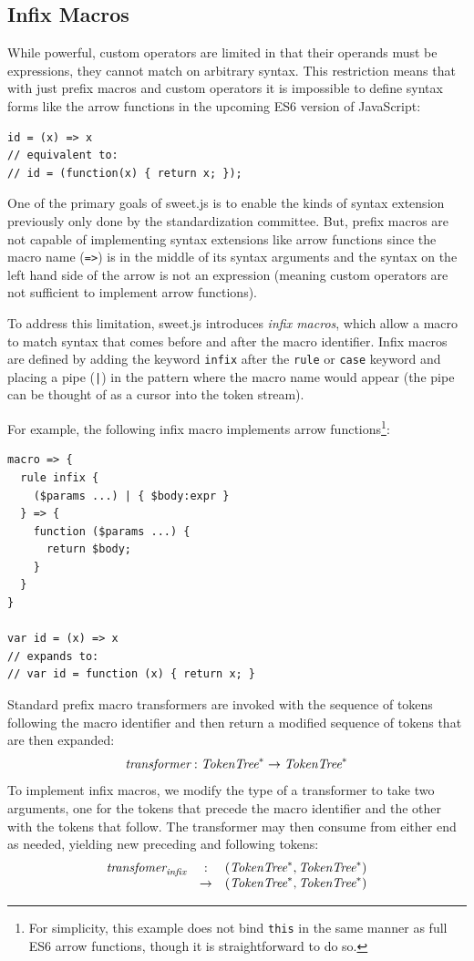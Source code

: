 \documentclass[9pt]{sigplanconf}
\begin{document}
\subsection{Infix Macros}
\label{sec:infix}
While powerful, custom operators are limited in that their operands
must be expressions, they cannot match on arbitrary syntax.
This restriction means that with just prefix macros and custom
operators it is impossible to define syntax forms like the arrow
functions in the upcoming ES6 version of JavaScript:

\begin{lstlisting}
id = (x) => x
// equivalent to:
// id = (function(x) { return x; });
\end{lstlisting}

One of the primary goals of sweet.js is to enable the kinds of syntax
extension previously only done by the standardization committee. But,
prefix macros are not capable of implementing syntax extensions like
arrow functions since the macro name (\verb!=>!) is in the middle of
its syntax arguments and the syntax on the left hand side of the arrow
is not an expression (meaning custom operators are not sufficient to
implement arrow functions).

To address this limitation, sweet.js introduces \emph{infix macros},
which allow a macro to match syntax that comes before and after the macro
identifier. Infix macros are defined by adding the keyword
\verb!infix! after the \verb!rule! or \verb!case!
keyword and placing a pipe (\verb!|!) in the pattern where the
macro name would appear (the pipe can be thought of as a cursor into
the token stream).

For example, the following infix macro implements arrow
functions\footnote{For simplicity, this example does not bind
  \verb!this! in the same manner as full ES6 arrow functions, though
  it is straightforward to do so.}:
\begin{lstlisting}
macro => {
  rule infix {
    ($params ...) | { $body:expr }
  } => {
    function ($params ...) {
      return $body; 
    }
  }
}

var id = (x) => x
// expands to:
// var id = function (x) { return x; }
\end{lstlisting}


Standard prefix macro transformers are invoked with the sequence of
tokens following the macro identifier and then return a modified
sequence of tokens that are then expanded:
\[
\textit{transformer} : \textit{TokenTree}^* \rightarrow \textit{TokenTree}^*
\]
To implement infix macros, we modify the type of a transformer to
take two arguments, one for the tokens that precede the macro
identifier and the other with the tokens that follow. The transformer
may then consume from either end as needed, yielding new preceding
and following tokens:
\[
\begin{array}{rcl}
  \textit{transfomer}_{\textit{infix}} &:& (\textit{TokenTree}^*, \textit{TokenTree}^*) 
  \\
  &\rightarrow& (\textit{TokenTree}^*, \textit{TokenTree}^*)
\end{array}
\]
\end{document}
